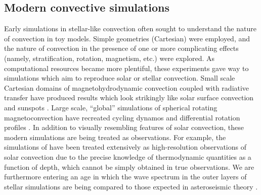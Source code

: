\documentclass[aasms,11pt, longbibliography]{article}
\begin{document}
\subsection{Modern convective simulations}
\label{sct:modern_simulations}
Early simulations in stellar-like convection \citep{graham1975, hurlburt&all1984, cattaneo&all1991, brummell&all1996, brummell&all1998} often sought to understand the nature of convection in toy models.
Simple geometries (Cartesian) were employed, and the nature of convection in the presence of one or more complicating effects (namely, stratification, rotation, magnetism, etc.) were explored.
As computational resources became more plentiful, these experiments gave way to simulations which aim to reproduce solar or stellar convection.
Small scale Cartesian domains of magnetohydrodynamic convection coupled with radiative transfer have produced results which look strikingly like solar surface convection and sunspots \citep{stein&nordlund1998, rempel&all2009, stein&nordlund2012, rempel2014}.
Large scale, ``global'' simulations of spherical rotating magnetoconvection have recreated cycling dynamos and differential rotation profiles \citep{brown&all2010, brown&all2011, guerrero&all2016, brun&all2017, strugarek&all2018}.
In addition to visually resembling features of solar convection, these modern simulations are being treated as observations.
For example, the simulations of \citet{rempel2014} have been treated extensively as high-resolution observations of solar convection\citep[see e.g.,][and others]{vankooten&cranmer2017, shchukina&trujillo2019} due to the precise knowledge of thermodynamic quantities as a function of depth, which cannot be simply obtained in true observations.
We are furthermore entering an age in which the wave spectrum in the outer layers of stellar simulations are being compared to those expected in asteroseismic theory \citep{edelmann&all2019}.
\end{document}
